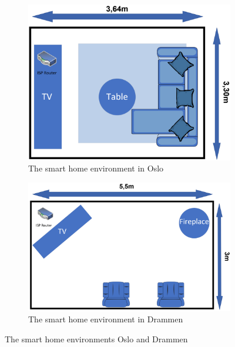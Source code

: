 \begin{figure}[H]
    \centering
    \begin{subfigure}[b]{0.60\textwidth}
        \includegraphics[width=\textwidth]{figures/Environment1.png}
        \caption{The smart home environment in Oslo}
        \label{fig:Environment1}
    \end{subfigure}
    \hfill
    \begin{subfigure}[b]{0.6\textwidth}
        \includegraphics[width=\textwidth]{figures/Environment2.png}
        \caption{The smart home environment in Drammen}
        \label{fig:Environmet2}
    \end{subfigure}
    \caption{The smart home environments Oslo and Drammen}
    \label{fig:SmartHomeEnvironments}
\end{figure}

